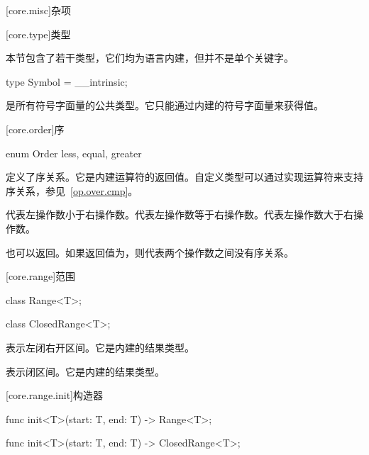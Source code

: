 
[core.misc]{杂项}

[core.type]{类型}

\pnum
本节包含了若干类型，它们均为语言内建，但并不是单个关键字。

\begin{itemdecl}
type Symbol = __intrinsic;
\end{itemdecl}

\pnum
{}是所有符号字面量的公共类型。它只能通过内建的符号字面量来获得值。

[core.order]{序}

\begin{itemdecl}
enum Order {
    less,
    equal,
    greater
}
\end{itemdecl}

\pnum
{}定义了序关系。它是内建运算符的返回值。自定义类型可以通过实现运算符来支持序关系，参见~\ref{op.over.cmp}。

\pnum
{}代表左操作数小于右操作数。代表左操作数等于右操作数。代表左操作数大于右操作数。

\pnum
{}也可以返回。如果返回值为，则代表两个操作数之间没有序关系。

[core.range]{范围}

\begin{itemdecl}
class Range<T>;
\end{itemdecl}

\begin{itemdecl}
class ClosedRange<T>;
\end{itemdecl}

\pnum
{}表示左闭右开区间。它是内建的结果类型。

\pnum
{}表示闭区间。它是内建的结果类型。

[core.range.init]{构造器}

\begin{itemdecl}
func init<T>(start: T, end: T) -> Range<T>;
\end{itemdecl}

\begin{itemdecl}
func init<T>(start: T, end: T) -> ClosedRange<T>;
\end{itemdecl}

